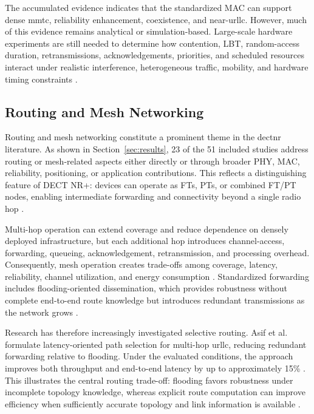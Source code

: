 The accumulated evidence indicates that the standardized MAC can support dense \gls{mmtc}, reliability enhancement, coexistence, and near-\gls{urllc}. However, much of this evidence remains analytical or simulation-based. Large-scale hardware experiments are still needed to determine how contention, LBT, random-access duration, retransmissions, acknowledgements, priorities, and scheduled resources interact under realistic interference, heterogeneous traffic, mobility, and hardware timing constraints \cite{gaidamakaOptimizingDelaysRandom2025, glazkovImprovingNearURLLCServices2025, ahmadMACLayerProtocolUltraReliable2025}.


\subsection{Routing and Mesh Networking}
\label{subsec:routing}

Routing and mesh networking constitute a prominent theme in the \gls{dectnr} literature. As shown in Section~\ref{sec:results}, 23 of the 51 included studies address routing or mesh-related aspects either directly or through broader PHY, MAC, reliability, positioning, or application contributions. This reflects a distinguishing feature of DECT NR+: devices can operate as FTs, PTs, or combined FT/PT nodes, enabling intermediate forwarding and connectivity beyond a single radio hop \cite{etsi_ts103636_1,etsi_ts103636_4,etsi_ts103636_5, kovalchukovDECT2020NewRadio2022, perez-guiraoDECTNRUnveiling2022}.

Multi-hop operation can extend coverage and reduce dependence on densely deployed infrastructure, but each additional hop introduces channel-access, forwarding, queueing, acknowledgement, retransmission, and processing overhead. Consequently, mesh operation creates trade-offs among coverage, latency, reliability, channel utilization, and energy consumption \cite{etsi_ts103636_4,etsi_ts103636_5, samuylovPerformanceMACLayer2024a}. Standardized forwarding includes flooding-oriented dissemination, which provides robustness without complete end-to-end route knowledge but introduces redundant transmissions as the network grows \cite{etsi_ts103636_5}.

Research has therefore increasingly investigated selective routing. Asif et al. formulate latency-oriented path selection for multi-hop \gls{urllc}, reducing redundant forwarding relative to flooding. Under the evaluated conditions, the approach improves both throughput and end-to-end latency by up to approximately 15\% \cite{asifURLLCBasedMultiHopCommunication2025}. This illustrates the central routing trade-off: flooding favors robustness under incomplete topology knowledge, whereas explicit route computation can improve efficiency when sufficiently accurate topology and link information is available \cite{asifURLLCBasedMultiHopCommunication2025, fuhrlingRobustRoutingProtocol2025b}.


